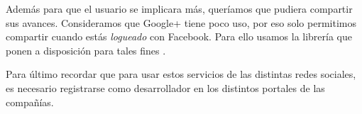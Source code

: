 \vspace{1em}
Además para que el usuario se implicara más, queríamos que pudiera compartir sus avances. Consideramos que Google+ tiene poco uso, por eso solo permitimos compartir cuando estás \emph{logueado} con Facebook. Para ello usamos la librería que ponen a disposición para tales fines \cite{libreriaFacebook}.

\vspace{1em}
Para último recordar que para usar estos servicios de las distintas redes sociales, es necesario registrarse como desarrollador en los distintos portales de las compañías.